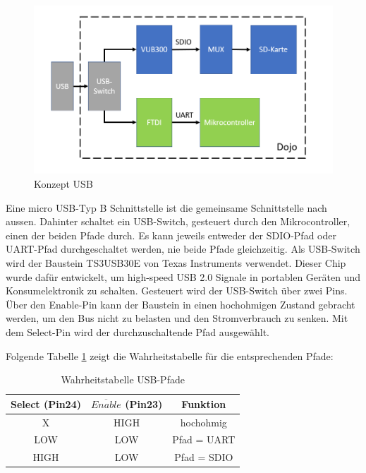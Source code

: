 \begin{figure}[h]
	\centering
	\includegraphics[width=\textwidth]{Bilder/Konzept_USB.PNG}
	\caption{Konzept USB}
	\label{Konzept_USB}
\end{figure}

Eine micro USB-Typ B Schnittstelle ist die gemeinsame Schnittstelle nach aussen. Dahinter schaltet ein USB-Switch, gesteuert durch den Mikrocontroller, einen der beiden Pfade durch. Es kann jeweils entweder der SDIO-Pfad oder UART-Pfad durchgeschaltet werden, nie beide Pfade gleichzeitig.\newline
Als USB-Switch wird der Baustein TS3USB30E von Texas Instruments verwendet. Dieser Chip wurde dafür entwickelt, um high-speed USB 2.0 Signale in portablen Geräten und Konsumelektronik zu schalten. Gesteuert wird der USB-Switch über zwei Pins. Über den Enable-Pin kann der Baustein in einen hochohmigen Zustand gebracht werden, um den Bus nicht zu belasten und den Stromverbrauch zu senken. Mit dem Select-Pin wird der durchzuschaltende Pfad ausgewählt.

Folgende Tabelle \ref{truth_table_usb} zeigt die Wahrheitstabelle für die entsprechenden Pfade:
\begin{table}[h]
	\centering
	\begin{tabular}{|c|c|c|} 
		Select (Pin24) & $\overline{Enable}$ (Pin23) & Funktion \\ 
		\hline 
		X & HIGH & hochohmig \\ 
		\hline 
		LOW & LOW & Pfad = UART \\ 
		\hline 
		HIGH & LOW & Pfad = SDIO \\ 
	\end{tabular} 
	\caption{Wahrheitstabelle USB-Pfade}
	\label{truth_table_usb}
\end{table}

